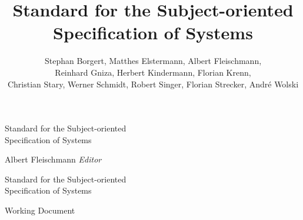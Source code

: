 \documentclass[11pt, showtrims, final, oldfontcommands]{memoir}
\title{Standard for the Subject-oriented\\ Specification of Systems}
\author{Stephan Borgert, Matthes Elstermann, Albert Fleischmann, \\ Reinhard Gniza, Herbert Kindermann, Florian Krenn,\\ Christian Stary, Werner Schmidt, Robert Singer, Florian Strecker, Andr\'e Wolski}
\begin{document}

\frontmatter

\pagestyle{empty}

\vspace*{3cm}
\begin{adjustwidth}{0cm}{-3cm}
	\begin{flushright}
		\LARGE\textsf {Standard for the Subject-oriented\\Specification of Systems}
	\end{flushright}
\end{adjustwidth}
\vspace*{\fill}
\cleardoublepage

\vspace*{0cm}
\begin{flushleft}
	\Large\textsf{Albert Fleischmann \textit{Editor}}\par
\end{flushleft}
\vspace{2cm}
\begin{flushleft}
	\Huge\textsf{Standard for the Subject-oriented\\Specification of Systems}\par
	\bigskip\bigskip
	\Large\textsf{Working Document}
\end{flushleft}
\vspace{2.5cm}
\begin{flushleft}
\end{flushleft}
\vspace*{\fill}
\clearpage
\end{document}
